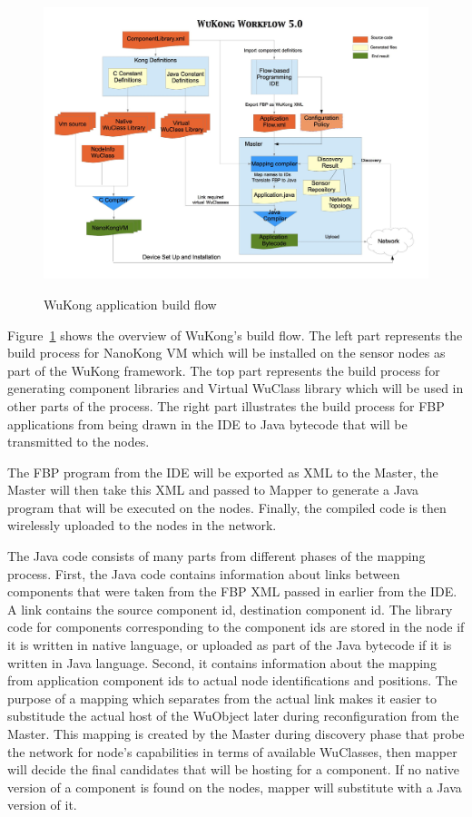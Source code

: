 \begin{figure}[h!]
\caption{WuKong application build flow}
\centering
    \includegraphics[width=\linewidth]{figures/wukong-flow}
\label{fig:wukong-flow}
\end{figure}

Figure~\ref{fig:wukong-flow} shows the overview of WuKong's build flow. The
left part represents the build process for NanoKong VM which will be installed
on the sensor nodes as part of the WuKong framework. The top part represents
the build process for generating component libraries and Virtual WuClass
library which will be used in other parts of the process. The right part
illustrates the build process for FBP applications from being drawn in the IDE
to Java bytecode that will be transmitted to the nodes.

The FBP program from the IDE will be exported as XML to the Master, the Master
will then take this XML and passed to Mapper to generate a Java program that
will be executed on the nodes. Finally, the compiled code is then wirelessly
uploaded to the nodes in the network.

The Java code consists of many parts from different phases of the mapping process.
First, the Java code contains information about links between components that
were taken from the FBP XML passed in earlier from the IDE. A link contains the
source component id, destination component id. The library code for components
corresponding to the component ids are stored in the node if it is written in
native language, or uploaded as part of the Java bytecode if it is written in
Java language. Second, it contains information about the mapping from
application component ids to actual node identifications and positions. The
purpose of a mapping which separates from the actual link makes it easier to
substitude the actual host of the WuObject later during
reconfiguration from the Master. This mapping is created by the Master during
discovery phase that probe the network for node's capabilities in terms of
available WuClasses, then mapper will decide the final candidates that will be
hosting for a component. If no native version of a component is found on the
nodes, mapper will substitute with a Java version of it.

